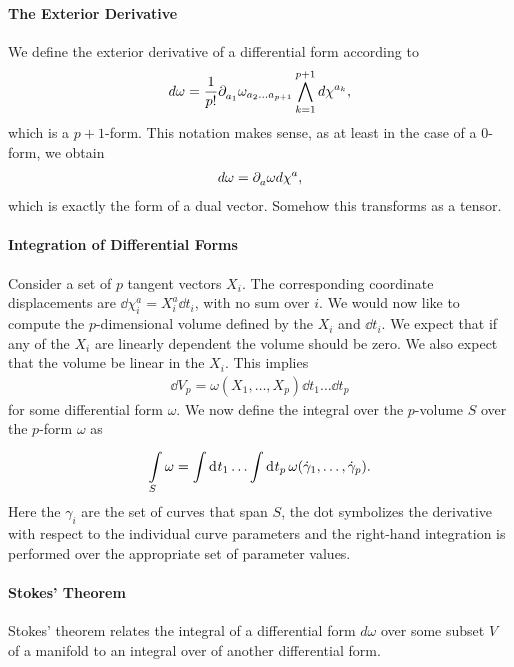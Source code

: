 \paragraph{The Exterior Derivative}
We define the exterior derivative of a differential form according to
\begin{align*}
	d\omega = \frac{1}{p!}\partial^{}_{a_{1}}\omega_{a_{2}\dots a_{p + 1}}\bigwedge\limits_{k = 1}^{p + 1}d\chi^{a_{k}},
\end{align*}
which is a $p + 1$-form. This notation makes sense, as at least in the case of a $0$-form, we obtain
\begin{align*}
	d\omega = \partial^{}_{a}\omega d\chi^{a},
\end{align*}
which is exactly the form of a dual vector. Somehow this transforms as a tensor.

\paragraph{Integration of Differential Forms}
Consider a set of $p$ tangent vectors $X_{i}$. The corresponding coordinate displacements are $\dd{\chi_{i}^{a}} = X_{i}^{a}\dd{t_{i}}$, with no sum over $i$. We would now like to compute the $p$-dimensional volume defined by the $X_{i}$ and $\dd{t_{i}}$. We expect that if any of the $X_{i}$ are linearly dependent the volume should be zero. We also expect that the volume be linear in the $X_{i}$. This implies
\begin{align*}
\dd{V_{p}} = \omega(X_{1}, \dots, X_{p})\dd{t_{1}}\dots\dd{t_{p}}
\end{align*}
for some differential form $\omega$. We now define the integral over the $p$-volume $S$ over the $p$-form $\omega$ as
\begin{align*}
\minteg{S}{\omega} = \integ{}{}{t_{1}}{\dots \integ{}{}{t_{p}}{\omega(\dot{\gamma}_{1},\dots, \dot{\gamma}_{p})}}.
\end{align*}
Here the $\gamma_{i}$ are the set of curves that span $S$, the dot symbolizes the derivative with respect to the individual curve parameters and the right-hand integration is performed over the appropriate set of parameter values.

\paragraph{Stokes' Theorem}
Stokes' theorem relates the integral of a differential form $d\omega$ over some subset $V$ of a manifold to an integral over  of another differential form.

